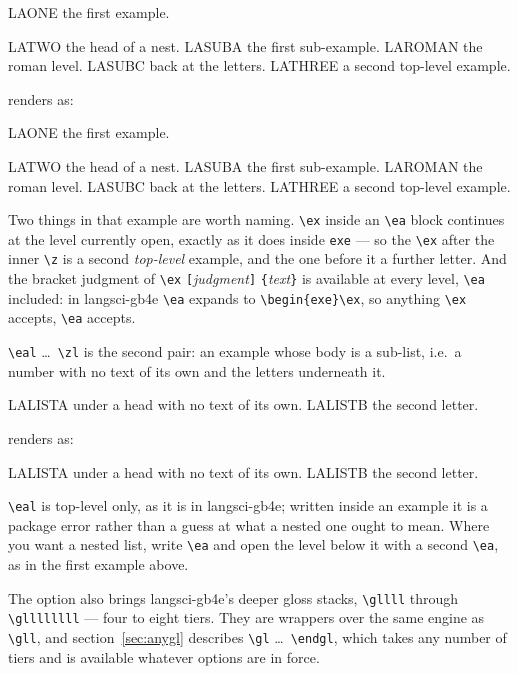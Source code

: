 \documentclass[11pt,a4paper]{article}
\newcommand{\cs}[1]{\texttt{\textbackslash #1}}
\newcommand{\pkg}[2][]{\textsf{#2}}
\newcommand{\meta}[1]{\textrm{\itshape\textlangle#1\textrangle}}
\newcommand{\marg}[1]{\penalty300 \texttt{\{}\meta{#1}\texttt{\}}}
\newcommand{\oarg}[1]{\penalty300 \texttt{[}\meta{#1}\texttt{]}}
\newcommand{\rendered}{\par\medskip\noindent\textcolor{gray!70}{\small renders as:}\par\nobreak\smallskip}
\newcommand{\afterex}{\par\addvspace{\medskipamount}}
\begin{document}
\begin{code}
\ea LAONE the first example.
\z

\ea LATWO the head of a nest.
  \ea LASUBA the first sub-example.
    \ea LAROMAN the roman level.
    \z
  \ex LASUBC back at the letters.
  \z
\ex LATHREE a second top-level example.
\z
\end{code}

\rendered
\ea LAONE the first example.
\z

\ea LATWO the head of a nest.
  \ea LASUBA the first sub-example.
    \ea LAROMAN the roman level.
    \z
  \ex LASUBC back at the letters.
  \z
\ex LATHREE a second top-level example.
\z

\afterex
Two things in that example are worth naming. \cs{ex} inside an \cs{ea}
block continues at the level currently open, exactly as it does inside
\texttt{exe} --- so the \cs{ex} after the inner \cs{z} is a second
\emph{top-level} example, and the one before it a further letter. And the
bracket judgment of \cs{ex}\oarg{judgment}\marg{text} is available at
every level, \cs{ea} included: in \pkg{langsci-gb4e} \cs{ea} expands to
\cs{begin\{exe\}}\cs{ex}, so anything \cs{ex} accepts, \cs{ea} accepts.

\cs{eal} \dots\ \cs{zl} is the second pair: an example whose body is a
sub-list, i.e.\ a number with no text of its own and the letters
underneath it.

\begin{code}
\eal
  \ex LALISTA under a head with no text of its own.
  \ex LALISTB the second letter.
\zl
\end{code}

\rendered
\eal
  \ex LALISTA under a head with no text of its own.
  \ex LALISTB the second letter.
\zl

\afterex
\cs{eal} is top-level only, as it is in \pkg{langsci-gb4e}; written inside
an example it is a package error rather than a guess at what a nested one
ought to mean. Where you want a nested list, write \cs{ea} and open the
level below it with a second \cs{ea}, as in the first example above.

The option also brings \pkg{langsci-gb4e}'s deeper gloss stacks,
\cs{gllll} through \cs{gllllllll} --- four to eight tiers. They are
wrappers over the same engine as \cs{gll}, and section~\ref{sec:anygl}
describes \cs{gl} \dots\ \cs{endgl}, which takes any number of tiers and
is available whatever options are in force.
\end{document}
